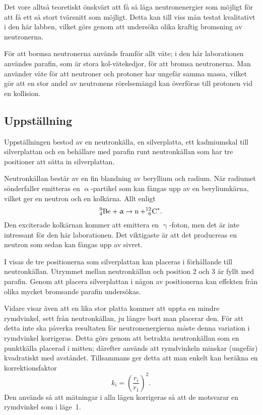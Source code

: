 \documentclass[11pt,a4paper, english, swedish
]{article}
\newcommand{\A}{\ifmmode\upalpha\else$\upalpha$\fi}
\newcommand{\G}{\ifmmode\upgamma\else$\upgamma$\fi}
\begin{document}
Det vore alltså teoretiskt önskvärt att få så låga neutronenergier som möjligt för att få ett så stort tvärsnitt som möjligt. Detta kan till viss mån testat kvalitativt i den här labben, vilket görs genom att undersöka olika kraftig bromsning av neutronerna. 

För att bormsa neutronerna används framför allt väte; i den här laborationen användes parafin, som är stora kol-vätekedjor, för att bromsa neutronerna. Man använder väte för att neutroner och protoner har ungefär samma massa, vilket gör att en stor andel av neutronens rörelsemängd kan överföras till protonen vid en kollision. 

\subsection{Uppställning}
Uppställningen bestod av en neutronkälla, en silverplatta, ett kadmiumskal till silverplattan och en behållare med parafin runt neutronkällan som har tre positioner att sätta in silverplattan.

Neutronkällan består av en fin blandning av beryllium och radium. När radiumet sönderfaller emitteras en \A-partikel som kan fångas upp av en beryliumkärna, vilket ger en neutron och en kolkärna. Allt enligt
\begin{equation}
^9_4\text{Be} + \A \to \text{n} + ^{12}_{\phantom{1}6}\!\text{C}^*.
\end{equation}
Den exciterade kolkärnan kommer att emittera en \G-foton, men det är inte intressant för den här laborationen. Det viktigaste är att det producreas en neutron som sedan kan fångas upp av sivret.

I  visas de tre positionerna som silverplattan kan placeras i förhållande till neutronkällan. Utrymmet mellan neutronkällan och position 2 och 3  är fyllt med parafin. Genom att placera silverplattan i någon av positionerna kan effekten från olika mycket bromsande parafin undersökas.

Vidare visar även  att en lika stor platta kommer att uppta en mindre rymdvinkel, sett från neutronkällan, ju längre bort man placerar den. För att detta inte ska påverka resultaten för neutronenergierna måste denna variation i rymdvinkel korrigeras. Detta görs genom att betrakta neutronkällan som en punktkälla placerad i mitten; därefter används att rymdvinkeln minskar (ungefär) kvadratiskt med avståndet. Tillsammans ger detta att man enkelt kan beräkna en korrektionsfaktor 
\begin{equation} \label{eq:k}
k_i=\left(\frac{r_i}{r_1} \right)^2.
\end{equation}
Den används så att mätningar i alla lägen korrigeras så att de motsvarar en rymdvinkel som i läge~1.
\end{document}
